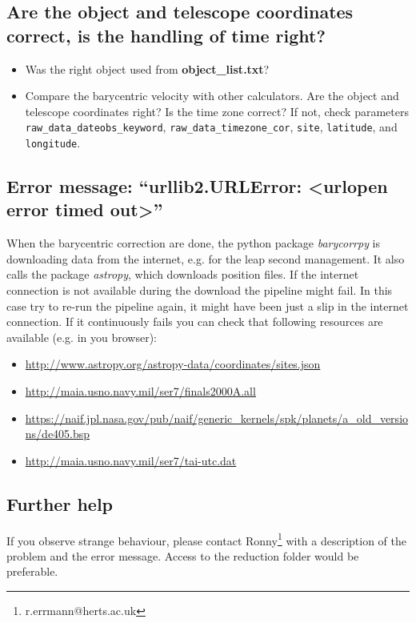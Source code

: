 \documentclass[10pt,a4paper]{article}
\begin{document}
\subsection{Are the object and telescope coordinates correct, is the handling of time right?}
\begin{itemize}
  \item Was the right object used from \textbf{object\_list.txt}?
  \item Compare the barycentric velocity with other calculators. Are the object and telescope coordinates right? Is the time zone correct? If not, check parameters \verb|raw_data_dateobs_keyword|, \verb|raw_data_timezone_cor|, \verb|site|, \verb|latitude|, and \verb|longitude|.
\end{itemize}

\subsection{Error message: ``urllib2.URLError: \textless urlopen error timed out\textgreater''}
When the barycentric correction are done, the python package \textit{barycorrpy} is downloading data from the internet, e.g. for the leap second management. It also calls the package \textit{astropy}, which downloads position files. If the internet connection is not available during the download the pipeline might fail. In this case try to re-run the pipeline again, it might have been just a slip in the internet connection. If it continuously fails you can check that following resources are available (e.g. in you browser):
\begin{itemize}
  \item \url{http://www.astropy.org/astropy-data/coordinates/sites.json}
  \item \url{http://maia.usno.navy.mil/ser7/finals2000A.all}
  \item \url{https://naif.jpl.nasa.gov/pub/naif/generic_kernels/spk/planets/a_old_versions/de405.bsp}
  \item \url{http://maia.usno.navy.mil/ser7/tai-utc.dat}
\end{itemize}


\subsection{Further help}
If you observe strange behaviour, please contact Ronny\footnote{r.errmann@herts.ac.uk} with a description of the problem and the error message. Access to the reduction folder would be preferable.
\end{document}
